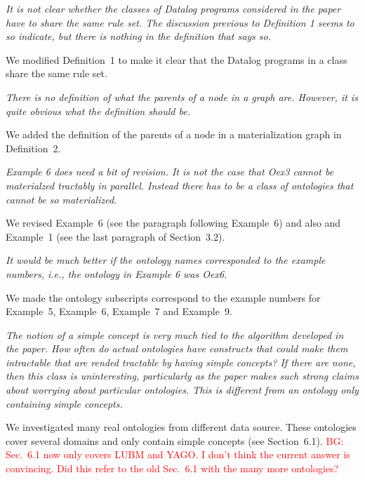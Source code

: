 \documentclass{article}
\let\quoteOld\quote
\let\endquoteOld\endquote
\renewenvironment{quote}{\quoteOld\itshape}{\endquoteOld}
\newcommand{\BG}[1]{\textcolor{red}{BG: #1}}
\begin{document}
\begin{quote}
It is not clear whether the classes of Datalog programs considered in the
paper have to share the same rule set.  The discussion previous to
Definition 1 seems to so indicate, but there is nothing in the definition
that says so.
\end{quote}

We modified Definition~1 to make it clear that the Datalog programs
in a class share the same rule set.

\begin{quote}
There is no definition of what the parents of a node in a graph are.
However, it is quite obvious what the definition should be.
\end{quote}

We added the definition of the parents of a node in a materialization graph in Definition~2.

\begin{quote}
Example 6 does need a bit of revision.  It is not the case that Oex3 cannot
be materialzed tractably in parallel.  Instead there has to be a class of
ontologies that cannot be so materialized.
\end{quote}

We revised Example~6 (see the paragraph following Example~6) and also
and Example~1 (see the last paragraph of Section~3.2).


\begin{quote}
It would be much better if the ontology names corresponded to the example
numbers, i.e., the ontology in Example 6 was Oex6.
\end{quote}

We made the ontology subscripts correspond to the example numbers
for Example~5, Example~6, Example~7 and Example~9.


\begin{quote}
The notion of a simple concept is very much tied to the algorithm developed
in the paper.  How often do actual ontologies have constructs that could
make them intractable that are rended tractable by having simple concepts?
If there are none, then this class is uninteresting, particularly as the
paper makes such strong claims about worrying about particular ontologies.
This is different from an ontology only containing simple concepts.
\end{quote}


We investigated many real ontologies from different data source. These ontologies cover
several domains and only contain simple concepts (see
Section~6.1). \BG{Sec.~6.1 now only covers LUBM and YAGO. I don't think the
current answer is convincing. Did this refer to the old Sec.~6.1 with
the many more ontologies?}\\
\end{document}
